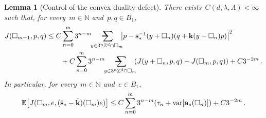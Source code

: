 \documentclass[11pt,twoside]{article} %
\makeatletter
\let\oldsquare\square %
\renewcommand{\square}{\oldsquare}
\numberwithin{equation}{section}
\newtheorem{lemma}[theorem]{Lemma}
\theoremstyle{definition}
\let\originalleft\left
\let\originalright\right
\renewcommand{\left}{\mathopen{}\mathclose\bgroup\originalleft}
\renewcommand{\right}{\aftergroup\egroup\originalright}
\newcommand*{\N}{\ensuremath{\mathbb{N}}}
\newcommand*{\Zd}{\ensuremath{\mathbb{Z}^d}}
\newcommand{\s}{\mathbf{s}}
\renewcommand{\a}{\mathbf{a}}
\renewcommand{\k}{\mathbf{k}}
\newcommand{\shom}{\bar{\mathbf{s}}}
\newcommand{\khom}{\bar{\mathbf{k}}}
\newcommand{\cu}{\square}
\newcommand{\E}{\mathbb{E}}
\DeclareMathOperator{\var}{var}
\newcommand{\avsum}{\mathop{\mathpalette\avsuminner\relax}\displaylimits}
\newcommand\avsuminner[2]{%
  {\sbox0{$\m@th#1\sum$}%
   \vphantom{\usebox0}%
   \ooalign{%
     \hidewidth
     \smash{\,\rule[.23em]{8.8pt}{1.1pt} \relax}%
     \hidewidth\cr
   ~$\m@th#1\sum$\cr
   }%
  }%
}
\makeatother
\begin{document}
\begin{lemma}
[Control of the convex duality defect]
\label{l.flatness.rules.nosymm}
There exists~$C(d,\lambda,\Lambda)<\infty$ such that, for every~$m\in\N$ and~$p,q\in B_1$, 
\begin{align}
\label{e.flatness.quenched.nosymm}
J(\cu_{m-1},p,q) 
&
\leq 
C\sum_{n=0}^{{m}} 3^{n-m} 
\!\! \avsum_{y\in 3^n\Zd\cap \cu_{m}} \!\!
\left| p -\s_*^{-1}(y+\cu_n) (q +\k(y+\cu_n)p )  \right|^2
\notag \\ & \qquad 
+ C
\sum_{n=0}^{{m}} 3^{n-m} 
\!\! \avsum_{y\in 3^{n}\Zd\cap \cu_m}  \!\!
( J(y+\cu_{n},p,q) - J (\cu_m,p,q) )
+C3^{-2m}
\,.
\end{align}
In particular, for every~$m\in\N$ and~$e\in  B_1$, 
\begin{align}
\label{e.flatness.rules.nosymm}
\E \left[ J(\cu_m,e,(\shom_*-\khom)(\cu_m)e) \right]
\leq 
C 
\sum_{n=0}^{m} 3^{n-m} 
\left( \tau_n + \var\left[ \a_*(\cu_n) \right] \right)
+C 3^{-2m}\,. 
\end{align}
\end{lemma}
\end{document}
